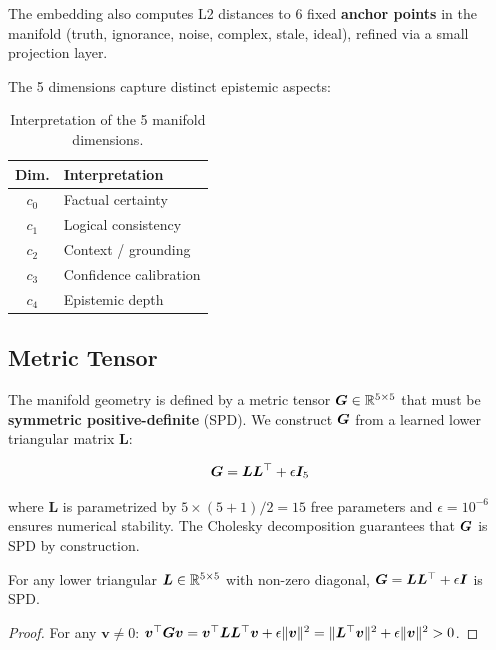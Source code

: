 The embedding also computes L2 distances to 6 fixed
\textbf{anchor points} in the manifold (truth, ignorance, noise,
complex, stale, ideal), refined via a small projection layer.

The 5 dimensions capture distinct epistemic aspects:

\begin{table}[H]
\centering
\caption{Interpretation of the 5 manifold dimensions.}
\label{tab:dims_5d}
\begin{tabular}{cl}
\toprule
\textbf{Dim.} & \textbf{Interpretation} \\
\midrule
$c_0$ & Factual certainty \\
$c_1$ & Logical consistency \\
$c_2$ & Context / grounding \\
$c_3$ & Confidence calibration \\
$c_4$ & Epistemic depth \\
\bottomrule
\end{tabular}
\end{table}

\subsection{Metric Tensor}

The manifold geometry is defined by a metric tensor
$\bm{G} \in \mathbb{R}^{5 \times 5}$ that must be \textbf{symmetric positive-definite}
(SPD). We construct $\bm{G}$ from a learned lower triangular matrix $\bm{L}$:

\begin{equation}
    \bm{G} = \bm{L}\bm{L}^\top + \epsilon \bm{I}_5
    \label{eq:metric_spd}
\end{equation}

where $\bm{L}$ is parametrized by $5 \times (5+1) / 2 = 15$ free
parameters and $\epsilon = 10^{-6}$ ensures numerical stability. The
Cholesky decomposition guarantees that $\bm{G}$ is SPD by construction.

\begin{proposition}
For any lower triangular $\bm{L} \in \mathbb{R}^{5 \times 5}$ with non-zero
diagonal, $\bm{G} = \bm{L}\bm{L}^\top + \epsilon \bm{I}$ is SPD.
\end{proposition}

\begin{proof}
For any $\bm{v} \neq 0$:
$\bm{v}^\top \bm{G} \bm{v} = \bm{v}^\top \bm{L}\bm{L}^\top \bm{v} + \epsilon \|\bm{v}\|^2
= \|\bm{L}^\top \bm{v}\|^2 + \epsilon \|\bm{v}\|^2 > 0$.
\end{proof}

